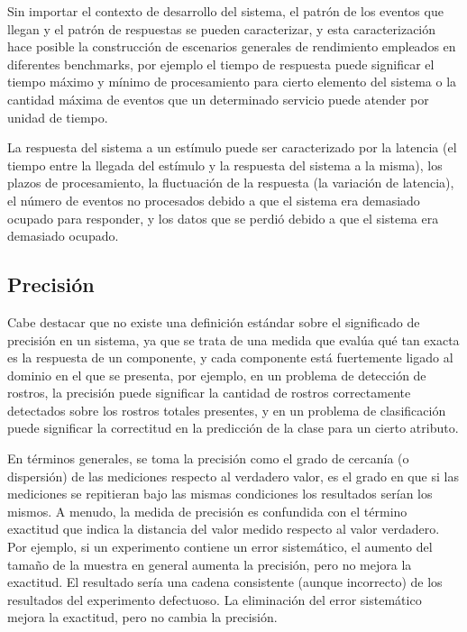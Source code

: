 Sin importar el contexto de desarrollo del sistema, el patrón de los
eventos que llegan y el patrón de respuestas se pueden caracterizar,
y esta caracterización hace posible la construcción de escenarios
generales de rendimiento empleados en diferentes benchmarks, por ejemplo
el tiempo de respuesta puede significar el tiempo máximo y mínimo
de procesamiento para cierto elemento del sistema o la cantidad máxima
de eventos que un determinado servicio puede atender por unidad de
tiempo. 

La respuesta del sistema a un estímulo puede ser caracterizado por
la latencia (el tiempo entre la llegada del estímulo y la respuesta
del sistema a la misma), los plazos de procesamiento, la fluctuación
de la respuesta (la variación de latencia), el número de eventos no
procesados debido a que el sistema era demasiado ocupado para responder,
y los datos que se perdió debido a que el sistema era demasiado ocupado. 


\subsection{Precisión\label{subsec:Atributos-de-calidad-Precisi=0000F3n}}

Cabe destacar que no existe una definición estándar sobre el significado
de precisión en un sistema, ya que se trata de una medida que evalúa
qué tan exacta es la respuesta de un componente, y cada componente
está fuertemente ligado al dominio en el que se presenta, por ejemplo,
en un problema de detección de rostros, la precisión puede significar
la cantidad de rostros correctamente detectados sobre los rostros
totales presentes, y en un problema de clasificación puede significar
la correctitud en la predicción de la clase para un cierto atributo.

En términos generales, se toma la precisión como el grado de cercanía
(o dispersión) de las mediciones respecto al verdadero valor, es el
grado en que si las mediciones se repitieran bajo las mismas condiciones
los resultados serían los mismos. A menudo, la medida de precisión
es confundida con el término exactitud que indica la distancia del
valor medido respecto al valor verdadero. Por ejemplo, si un experimento
contiene un error sistemático, el aumento del tamaño de la muestra
en general aumenta la precisión, pero no mejora la exactitud. El resultado
sería una cadena consistente (aunque incorrecto) de los resultados
del experimento defectuoso. La eliminación del error sistemático mejora
la exactitud, pero no cambia la precisión. 


